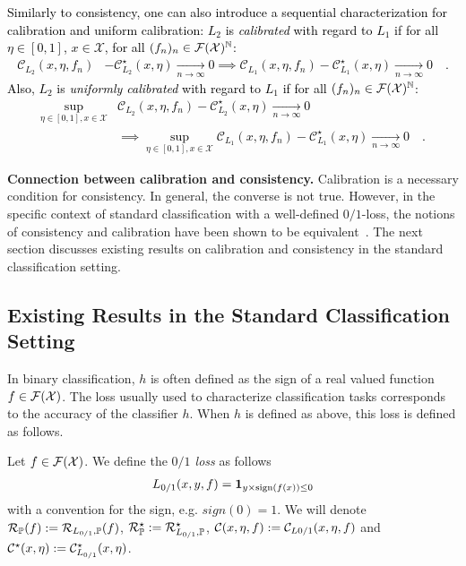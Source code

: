 \textcolor{black}{
Similarly to consistency, one can also introduce a sequential characterization for calibration and uniform calibration: $L_2$ is \emph{calibrated} with regard to $L_1$ if for all $\eta\in[0,1]$, $x\in\mathcal{X}$, for all $(f_n)_n\in\mathcal{F}(\mathcal{X})^\mathbb{N}$:
\begin{align*}
   \mathcal{C}_{L_2}(x,\eta,f_n)&- \mathcal{C}^\star_{L_2}(x,\eta)\xrightarrow[n\to\infty]{} 0
   \implies \mathcal{C}_{L_1}(x,\eta,f_n)- \mathcal{C}^\star_{L_1}(x,\eta)\xrightarrow[n\to\infty]{} 0\quad.
\end{align*}
} 
\textcolor{black}{
Also, $L_2$ is \emph{uniformly calibrated} with regard to $L_1$ if for all $(f_n)_n\in\mathcal{F}(\mathcal{X})^\mathbb{N}$:
\begin{align*}
    \sup_{\eta\in[0,1],x\in\mathcal{X}} &\mathcal{C}_{L_2}(x,\eta,f_n)- \mathcal{C}^\star_{L_2}(x,\eta)\xrightarrow[n\to\infty]{} 0\\\
    &\implies\sup_{\eta\in[0,1],x\in\mathcal{X}} \mathcal{C}_{L_1}(x,\eta,f_n)- \mathcal{C}^\star_{L_1}(x,\eta)\xrightarrow[n\to\infty]{} 0\quad.
\end{align*} }


\textbf{Connection between calibration and consistency.}
Calibration is a necessary condition for consistency. In general, the converse is not true. However, in the specific context of standard classification with a well-defined $0/1$-loss, the notions of consistency and calibration have been shown to be equivalent~\citep{zhang2004statistical,bartlett2006convexity,steinwart2007compare}. The next section discusses existing results on calibration and consistency in the standard classification setting. 


\subsection{Existing Results in the Standard Classification Setting}

In binary classification, $h$ is often defined as the sign of a real valued function $f \in \mathcal{F}(\mathcal{X})$. The loss usually used to characterize classification tasks corresponds to the accuracy of the classifier $h$. When $h$ is defined as above, this loss is defined as follows.




\begin{definition}[$0/1$ loss]
Let $f \in \mathcal{F}(\mathcal{X})$. We define the \emph{$0/1$ loss} as follows
\begin{align*}
     L_{0/1}(x,y,f)=\mathbf{1}_{y\times\text{sign}(f(x))\leq 0}
\end{align*}
 with a convention for the sign, e.g. $sign(0) = 1$.  We will denote $\mathcal{R}_{\mathbb{P}}(f) :=\mathcal{R}_{L_{0/1},\mathbb{P}}(f)$,  $\mathcal{R}_{\mathbb{P}}^\star :=\mathcal{R}_{L_{0/1},\mathbb{P}}^\star$, $\mathcal{C}(x,\eta,f):= \mathcal{C}_{L{0/1}}(x,\eta,f)$ and $\mathcal{C}^\star(x,\eta):= \mathcal{C}^\star_{L_{0/1}}(x,\eta)$.
\end{definition}

